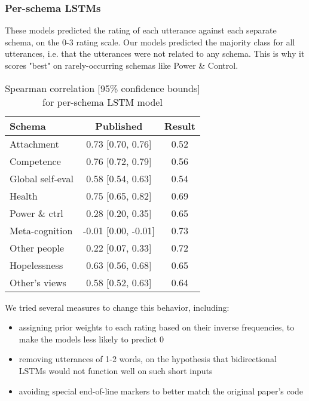 \documentclass[11pt,a4paper]{article}
\begin{document}
\subsubsection{Per-schema LSTMs}
\label{section:per_schema_rnn}
These models predicted the rating of each utterance against each separate schema, on the 0-3 rating scale. Our models predicted the majority class for all utterances, i.e. that the utterances were not related to any schema. This is why it scores "best" on rarely-occurring schemas like Power \& Control.

\begin{table}[H]
\centering
\begin{tabular}{lcc}
\toprule
Schema                  &Published          &Result \\
\midrule
Attachment              & 0.73 [0.70, 0.76]  & 0.52 \\
Competence              & 0.76 [0.72, 0.79]  & 0.56 \\
Global self-eval        & 0.58 [0.54, 0.63]  & 0.54 \\
Health                  & 0.75 [0.65, 0.82]  & 0.69 \\
Power \& ctrl           & 0.28 [0.20, 0.35]  & 0.65 \\
Meta-cognition          & -0.01 [0.00, -0.01]& 0.73 \\
Other people            & 0.22 [0.07, 0.33]  & 0.72 \\
Hopelessness            & 0.63 [0.56, 0.68]  & 0.65 \\
Other's views           & 0.58 [0.52, 0.63]  & 0.64 \\
\bottomrule
\end{tabular}
\caption{Spearman correlation [95\% confidence bounds] for per-schema LSTM model}
\label{tab:per_schema_lstm}
\end{table}

We tried several measures to change this behavior, including:
\begin{itemize}
  \item assigning prior weights to each rating based on their inverse frequencies, to make the models less likely to predict 0
  \item removing utterances of 1-2 words, on the hypothesis that bidirectional LSTMs would not function well on such short inputs
  \item avoiding special end-of-line markers to better match the original paper's code
\end{itemize}
\end{document}
